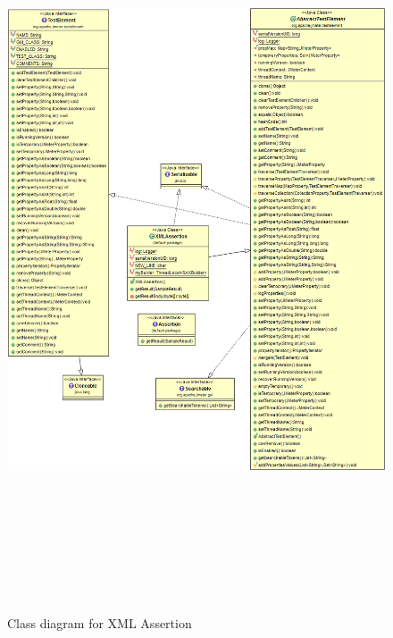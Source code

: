 \documentclass[12pt]{book}
\begin{document}
  \begin{figure}[H]
   \centering
   \includegraphics[width=17cm, height=22cm]{images/assertions_xml}
   \caption{Class diagram for XML Assertion\label{fig:fig3_JMeter}}
  \end{figure}
  
\end{document}
